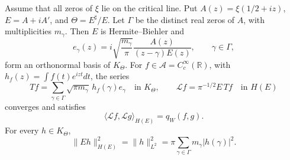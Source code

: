 \begin{theorem}\label{v4-arith:db:thm:db}
\label{v4-arith:w7-c:thm:Mellin-dB-isometry}
\label{v4-arith:w7-c:cor:ATP-as-dB-positivity}
Assume that all zeros of $\xi$ lie on the critical line.
Put $A(z)=\xi(1/2+iz)$, $E=A+iA'$, and $\Theta=E^\sharp/E$.
Let $\Gamma$ be the distinct real zeros of $A$, with multiplicities $m_\gamma$.
Then $E$ is Hermite--Biehler and
\begin{equation}\label{v4-arith:db:eq:basis}
 e_\gamma(z)=i\sqrt{\frac{m_\gamma}{\pi}}
       \frac{A(z)}{(z-\gamma)E(z)},\qquad \gamma\in\Gamma,
\end{equation}
form an orthonormal basis of $K_\Theta$.
For $f\in\mathscr A=C_c^\infty(\mathbb R)$, with
$h_f(z)=\int f(t)e^{izt}dt$, the series
\begin{equation}\label{v4-arith:db:eq:db-map}
 T f=\sum_{\gamma\in\Gamma}\sqrt{\pi m_\gamma}\,
              h_f(\gamma)e_\gamma\quad\text{in }K_\Theta,
 \qquad \mathcal L f=\pi^{-1/2}E\,Tf\quad\text{in }H(E)
\end{equation}
converges and satisfies
\begin{equation}\label{v4-arith:db:eq:db-pairing}
 \langle\mathcal L f,\mathcal L g\rangle_{H(E)}=q_W(f,g).
\end{equation}
For every $h\in K_\Theta$,
\begin{equation}\label{v4-arith:db:eq:sampling-norm}
 \|Eh\|_{H(E)}^2=\|h\|_{L^2}^2
            =\pi\sum_{\gamma\in\Gamma}m_\gamma|h(\gamma)|^2.
\end{equation}
\end{theorem}
